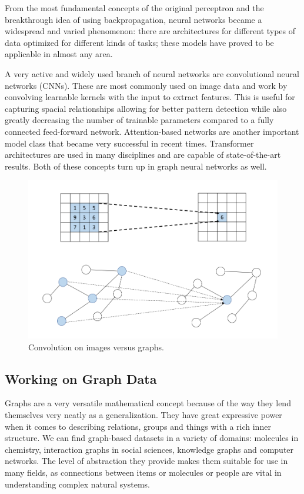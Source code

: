 	From the most fundamental concepts of the original perceptron and the breakthrough idea of using backpropagation, neural networks became a widespread and varied phenomenon: there are architectures for different types of data optimized for different kinds of tasks; these models have proved to be applicable in almost any area\cite{shrestha2019review}.
	
	A very active and widely used branch of neural networks are convolutional neural networks (CNNs)\cite{li2021survey}. These are most commonly used on image data and work by convolving learnable kernels with the input to extract features. This is useful for capturing spacial relationships allowing for better pattern detection while also greatly decreasing the number of trainable parameters compared to a fully connected feed-forward network. Attention-based networks\cite{vaswani2017attention} are another important model class that became very successful in recent times. Transformer architectures are used in many disciplines and are capable of state-of-the-art results. Both of these concepts turn up in graph neural networks as well.
	
	\begin{figure}[!h]
		\centering
		\includegraphics[width=\textwidth]{figures/convolution.png}
		\caption{Convolution on images versus graphs.}
	\end{figure}
	
	\subsection{Working on Graph Data}
	
	Graphs are a very versatile mathematical concept because of the way they lend themselves very neatly as a generalization. They have great expressive power when it comes to describing relations, groups and things with a rich inner structure. We can find graph-based datasets in a variety of domains: molecules in chemistry, interaction graphs in social sciences, knowledge graphs and computer networks\cite{zhou2020graph}. The level of abstraction they provide makes them suitable for use in many fields, as connections between items or molecules or people are vital in understanding complex natural systems.
	
